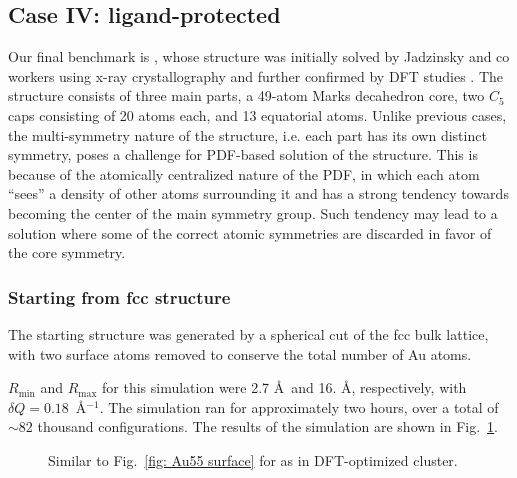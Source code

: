 \subsection{Case IV: ligand-protected }
Our final benchmark is , whose structure was initially solved by Jadzinsky and co workers using x-ray crystallography \cite{Jadzinsky2007} and further confirmed by DFT studies \cite{Li2008}. The  structure consists of three main parts, a 49-atom Marks decahedron core, two $C_{5}$ caps consisting of 20 atoms each, and 13 equatorial atoms. Unlike previous cases, the multi-symmetry nature of the structure, i.e. each part has its own distinct symmetry,  poses a  challenge for PDF-based solution of the structure. This is because of the atomically centralized nature of the PDF, in which each atom ``sees'' a density of other atoms surrounding it and has a strong tendency towards becoming the center of the main symmetry group. Such tendency may lead to a solution where some of the correct atomic symmetries are discarded in favor of the core symmetry.

\subsubsection{ Starting from fcc structure}
The starting structure was generated by a spherical cut of the fcc bulk lattice, with two surface atoms removed to conserve the total number of Au atoms.

 $R_\mathrm{min}$ and $R_\mathrm{max}$ for this simulation were 2.7 \AA ~and 16. \AA, respectively, with $\delta Q=0.18$~\AA$^{-1}$. The simulation ran for approximately two hours, over a total of $\sim$82 thousand configurations.  The results of the simulation are shown in Fig.~\ref{fig:Au102_fcc}.
\begin{figure}
  \def \localimgpath {Au_102_HMC_paper_final/55d7b3d4d2d355710ddb3fdc}
  \centering
    \quad
    \quad
    \quad
    \quad
    \quad
    \quad


  \caption{Similar to Fig.~\ref{fig: Au55 surface} for   as in DFT-optimized  cluster.}
  \label{fig:Au102_fcc}
\end{figure}

